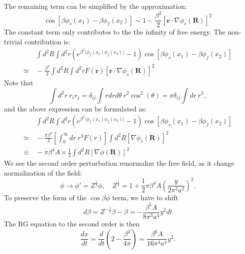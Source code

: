 \documentclass[aps,prb,superscriptaddress,nofootinbib]{revtex4}
\begin{document}
The remaining term can be simplified by the approximation:
\begin{equation}
	\cos\left[\beta\phi_s(x_1) -\beta\phi_f(x_2)\right]
	\sim 1-\frac{\beta^2}{2} [\bm r \cdot \nabla\phi_s(\bm R)]^2
\end{equation}
The constant term only contributes to the the infinity of free energy.
The non-trivial contribution is:
\begin{equation}
\begin{aligned}
	&\ \int d^2 R \int d^2 r \left(e^{\beta^2 \langle\phi_f(x_1)\phi_f(x_2)\rangle}-1 \right)\cos\left[\beta\phi_s(x_1) -\beta\phi_f(x_2)\right] \\
	\simeq &\ -\frac{\beta^4}{2} \int d^2 R \int d^2r F(\bm r) [\bm r \cdot \nabla\phi_s(\bm R)]^2
\end{aligned}
\end{equation}
Note that
\begin{equation}
	\int d^2r\ r_i r_j = \delta_{ij} \int r dr d\theta\ r^2 \cos^2(\theta) = \pi \delta_{ij} \int dr\ r^3,
\end{equation}
and the above expression can be formulated as:
\begin{equation}
\begin{aligned}
	&\ \int d^2 R \int d^2 r \left(e^{\beta^2 \langle\phi_f(x_1)\phi_f(x_2)\rangle}-1 \right)\cos\left[\beta\phi_s(x_1) -\beta\phi_f(x_2)\right] \\
	\simeq &\ -\frac{\pi \beta^4}{2} \left[\int_0^\infty dr\ r^3 F(r)\right] \int d^2 R [\nabla\phi_s(\bm R)]^2 \\
	\equiv &\ -\pi \beta^4 A \times \frac{1}{2}\int d^2 R [\nabla\phi(\bm R)]^2 
\end{aligned}
\end{equation}
We see the second order perturbation renormalize the free field, as it change normalization of the field:
\begin{equation}
	\phi \rightarrow \phi' = Z^{\frac{1}{2}} \phi, \quad 
	Z^{\frac{1}{2}} = 1 +\frac{1}{2} \pi \beta^4 A \left( \frac{y}{2\pi^2 a^2} \right)^2.
\end{equation}
To preserve the form of the $\cos\beta\phi$ term, we have to shift
\begin{equation}
	d\beta = Z^{-\frac{1}{2}}\beta - \beta = -\frac{\beta^5 A}{8 \pi^3 a^4} y^2 dt
\end{equation}
The RG equation to the second order is then
\begin{equation}
	\frac{dx}{dt} = \frac{d}{dt}\left(2-\frac{\beta^2}{4\pi}\right)
	= \frac{\beta^6 A}{16\pi^4 a^4} y^2.
\end{equation}
\end{document}
